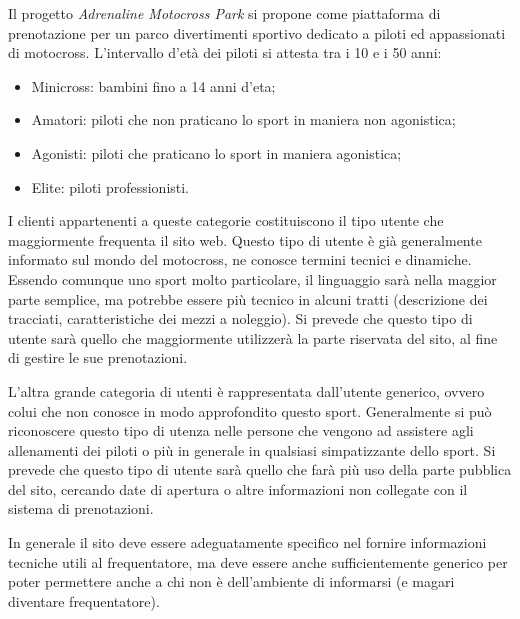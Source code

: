 Il progetto \textit{Adrenaline Motocross Park} si propone come piattaforma di prenotazione per un parco divertimenti sportivo dedicato a piloti ed appassionati di motocross. L'intervallo d'età dei piloti si attesta tra i 10 e i 50 anni:
\begin{itemize}
\item Minicross: bambini fino a 14 anni d'eta;
\item Amatori: piloti che non praticano lo sport in maniera non agonistica;
\item Agonisti: piloti che praticano lo sport in maniera agonistica;
\item Elite: piloti professionisti.
\end{itemize} 

I clienti appartenenti a queste categorie costituiscono il tipo utente che maggiormente frequenta il sito web. Questo tipo di utente è già generalmente informato sul mondo del motocross, ne conosce termini tecnici e dinamiche.
Essendo comunque uno sport molto particolare, il linguaggio sarà nella maggior parte semplice, ma potrebbe essere più tecnico in alcuni tratti (descrizione dei tracciati, caratteristiche dei mezzi a noleggio). Si prevede che questo tipo di utente sarà quello che maggiormente utilizzerà la parte riservata del sito,  al fine di gestire le sue prenotazioni.

L'altra grande categoria di utenti è rappresentata dall'utente generico, ovvero colui che non conosce in modo approfondito questo sport. Generalmente si può riconoscere questo tipo di utenza nelle persone che vengono ad assistere agli allenamenti dei piloti o più in generale in qualsiasi simpatizzante dello sport. Si prevede che questo tipo di utente sarà quello che farà più uso della parte pubblica del sito, cercando date di apertura o altre informazioni non collegate con il sistema di prenotazioni.

In generale il sito deve essere adeguatamente specifico nel fornire informazioni tecniche utili al frequentatore, ma deve essere anche sufficientemente generico per poter permettere anche a chi non è dell'ambiente di informarsi (e magari diventare frequentatore).